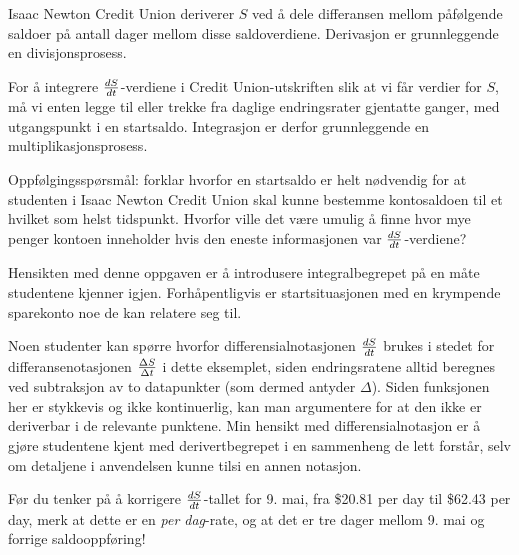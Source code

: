 Isaac Newton Credit Union deriverer $S$ ved å dele differansen mellom påfølgende saldoer på antall dager mellom disse saldoverdiene. Derivasjon er grunnleggende en divisjonsprosess.

For å integrere $dS\over dt$-verdiene i Credit Union-utskriften slik at vi får verdier for $S$, må vi enten legge til eller trekke fra daglige endringsrater gjentatte ganger, med utgangspunkt i en startsaldo. Integrasjon er derfor grunnleggende en multiplikasjonsprosess.

\vskip 10pt

Oppfølgingsspørsmål: forklar hvorfor en startsaldo er helt nødvendig for at studenten i Isaac Newton Credit Union skal kunne bestemme kontosaldoen til et hvilket som helst tidspunkt. Hvorfor ville det være umulig å finne hvor mye penger kontoen inneholder hvis den eneste informasjonen var $dS \over dt$-verdiene?







Hensikten med denne oppgaven er å introdusere integralbegrepet på en måte studentene kjenner igjen. Forhåpentligvis er startsituasjonen med en krympende sparekonto noe de kan relatere seg til.

Noen studenter kan spørre hvorfor differensialnotasjonen $dS \over dt$ brukes i stedet for differansenotasjonen $\Delta S \over \Delta t$ i dette eksemplet, siden endringsratene alltid beregnes ved subtraksjon av to datapunkter (som dermed antyder $\Delta$). Siden funksjonen her er stykkevis og ikke kontinuerlig, kan man argumentere for at den ikke er deriverbar i de relevante punktene. Min hensikt med differensialnotasjon er å gjøre studentene kjent med derivertbegrepet i en sammenheng de lett forstår, selv om detaljene i anvendelsen kunne tilsi en annen notasjon.

Før du tenker på å korrigere $dS \over dt$-tallet for 9. mai, fra \$20.81 per day til \$62.43 per day, merk at dette er en {\it per dag}-rate, og at det er tre dager mellom 9. mai og forrige saldooppføring!



